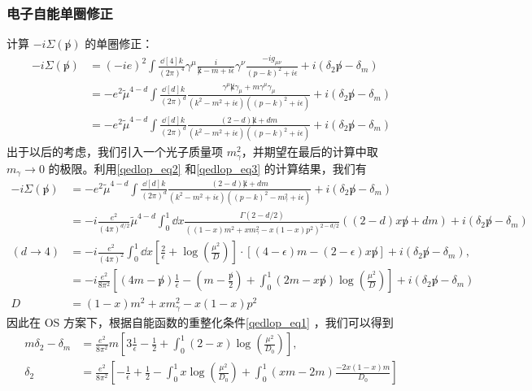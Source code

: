 \subsubsection{电子自能单圈修正}
计算 $-i\Sigma(\not p)$ 的单圈修正：
\begin{equation}
\begin{aligned}
-i\Sigma(\not p)
&=(-ie)^2 \int\frac{\dd[4]{k}}{(2\pi)^4} \gamma^\mu\frac{i}{\not k-m+i\epsilon} \gamma^\nu  \frac{-ig_{\mu\nu}}{(p-k)^2+i\epsilon}+i(\delta_2\not p -\delta_m)\\
&=-e^2\tilde{\mu}^{4-d} \int\frac{\dd[d]{k}}{(2\pi)^d} \frac{\gamma^\mu \not k \gamma_\mu + m\gamma^\mu\gamma_\mu}{(k^2-m^2+i\epsilon)((p-k)^2+i\epsilon)}+i(\delta_2\not p -\delta_m)
\\
&=-e^2\tilde{\mu}^{4-d} \int\frac{\dd[d]{k}}{(2\pi)^d} \frac{(2-d)\not k + dm}{(k^2-m^2+i\epsilon)((p-k)^2+i\epsilon)}+i(\delta_2\not p -\delta_m)
\end{aligned}
\end{equation}
出于以后的考虑，我们引入一个光子质量项 $m_\gamma^2$，并期望在最后的计算中取 $m_\gamma\rightarrow 0$ 的极限。利用\autoref{qedlop_eq2} 和\autoref{qedlop_eq3} 的计算结果，我们有
\begin{equation}
\begin{aligned}
-i\Sigma(\not p)
&=-e^2\tilde{\mu}^{4-d} \int\frac{\dd[d]{k}}{(2\pi)^d} \frac{(2-d)\not k + dm}{(k^2-m^2+i\epsilon)((p-k)^2-m_\gamma^2+i\epsilon)}+i(\delta_2\not p -\delta_m)
\\
&= -i\frac{e^2}{(4\pi)^{d/2}}\tilde{\mu}^{4-d}
\int_0^1 \dd x \frac{\Gamma(2-d/2)}{((1-x)m^2+x m_\gamma^2-x(1-x)p^2)^{2-d/2}}((2-d)x\not p+dm)
+i(\delta_2\not p -\delta_m)
\\
(d\rightarrow 4)&= -i\frac{e^2}{(4\pi)^2}  \int_0^1 \dd x \left[\frac{2}{\epsilon}+\log\left(\frac{\mu^2}{D}\right)\right]\cdot \left[(4-\epsilon)m -(2-\epsilon)x\not p\right]
+i(\delta_2\not p -\delta_m),\\
&=-i\frac{e^2}{8\pi^2}\left[(4m-\not p)\frac{1}{\epsilon}-\left(m-\frac{\not p}{2}\right)+ \int_0^1 (2m-x\not p)\log\left(\frac{\mu^2}{D}\right) \right]
+i(\delta_2\not p -\delta_m)\\
D&=(1-x)m^2+xm_\gamma^2-x(1-x)p^2
\end{aligned}
\end{equation}
因此在 OS 方案下，根据自能函数的重整化条件\autoref{qedlop_eq1} ，我们可以得到
\begin{equation}
\begin{aligned}
m\delta_2 - \delta_m &= \frac{e^2}{8\pi^2}m\left[3\frac{1}{\epsilon}-\frac{1}{2}+ \int_0^1 (2-x)\log\left(\frac{\mu^2}{D_0}\right) \right],\\
\delta_2 &= \frac{e^2}{8\pi^2}\left[-\frac{1}{\epsilon}+\frac{1}{2}-\int_0^1 x\log\left(\frac{\mu^2}{D_0} \right) 
+\int_0^1 (xm-2m)\frac{-2x(1-x)m}{D_0}
\right]
\end{aligned}
\end{equation}
